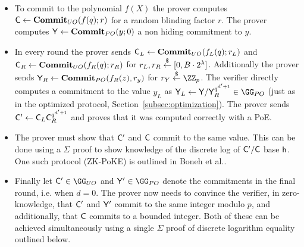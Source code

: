 \begin{itemize}
\item To commit to the polynomial $f(X)$ the prover computes $\mathsf{C}\gets \textbf{{Commit}}_{UO}(f(q);r)$ for a random blinding factor $r$. 
The prover computes $\mathsf{Y}\gets \textbf{{Commit}}_{PO}(y;0)$ a non hiding commitment to $y$.

\item In every round the prover sends $\mathsf{C}_L\gets\textbf{{Commit}}_{UO}(f_L(q);r_L)$ and $\mathsf{C}_R\gets\textbf{{Commit}}_{UO}(f_R(q);r_R)$ for $r_L,r_R \overset{\$}{\gets} [0,B\cdot 2^{\lambda}]$. Additionally the prover sends $\mathsf{Y}_R\gets\textbf{{Commit}}_{PO}(f_R(z),r_y)$ for $r_Y\sample \ZZ_p$. 
The verifier directly computes a commitment to the value $y_L$ as $\gr{Y}_L\gets\gr{Y}/\gr{Y}_R^{q^{d'+1}} \in \GG_{PO}$ (just as in the optimized protocol, Section~\ref{subsec:optimization}). The prover sends $\mathsf{C}'\gets \mathsf{C}_L\mathsf{C}_R^{q^{d'+1}}$ and proves that it was computed correctly with a PoE. 

\item The prover must show that $\mathsf{C}'$ and $\mathsf{C}$ commit to the same value. This can be done using a $\Sigma$ proof to show knowledge of the discrete log of $\mathsf{C}' / \mathsf{C}$ base $\mathsf{h}$. One such protocol (ZK-PoKE) is outlined in Boneh et al.\cite{C:BonBunFis19}.
 
\item Finally let $\gr{C}'\in \GG_{UO}$ and $\gr{Y}'\in \GG_{PO}$ denote the commitments in the final round, i.e. when $d=0$. The prover now needs to convince the verifier, in zero-knowledge, that $\mathsf{C}'$ and $\mathsf{Y}'$ commit to the same integer modulo $p$, and additionally, that $\mathsf{C}$ commits to a bounded integer. Both of these can be achieved simultaneously using a single $\Sigma$ proof of discrete logarithm equality outlined below.
\end{itemize}

